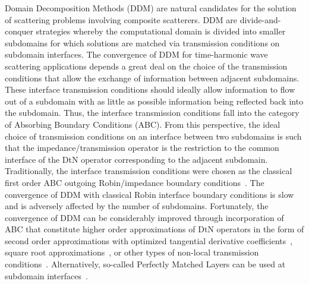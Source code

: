\documentclass[11pt]{article}
\numberwithin{equation}{section}
\begin{document}
Domain Decomposition Methods (DDM) are natural candidates for the solution of scattering problems involving composite scatterers. DDM are divide-and-conquer strategies whereby the computational domain is divided into smaller subdomains for which solutions are matched via transmission conditions on subdomain interfaces. The convergence of DDM for time-harmonic wave scattering applications depends a great deal on the choice of the transmission conditions that allow the exchange of information between adjacent subdomains. These interface transmission conditions should ideally allow information to flow out of a subdomain with as little as possible information being reflected back into the subdomain. Thus, the interface transmission conditions fall into the category of Absorbing Boundary Conditions (ABC). From this perspective, the ideal choice of transmission conditions on an interface between two subdomains is such that the impedance/transmission operator is the restriction to the common interface of the DtN operator corresponding to the adjacent subdomain. Traditionally, the interface transmission conditions were chosen as the classical first order ABC outgoing Robin/impedance boundary conditions~\cite{Depres,Collino1}. The convergence of DDM with classical Robin interface boundary conditions is slow and is adversely affected by the number of subdomains. Fortunately, the convergence of DDM can be considerably improved through incorporation of ABC that constitute higher order approximations of DtN operators in the form of second order approximations with optimized tangential derivative coefficients~\cite{Gander1}, square root approximations~\cite{boubendirDDM}, or other types of non-local transmission conditions~\cite{Collino1,steinbach2011stable}. Alternatively, so-called Perfectly Matched Layers can be used at subdomain interfaces~\cite{stolk2013rapidly}.
\end{document}
